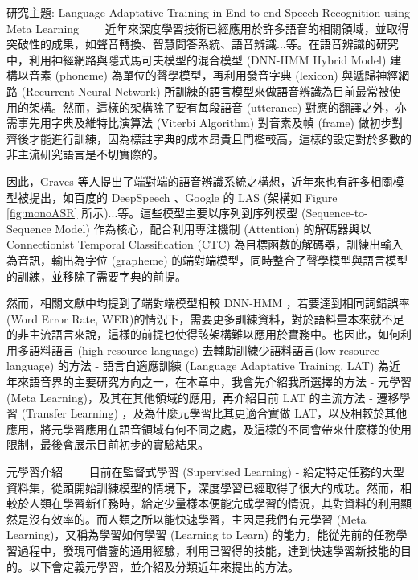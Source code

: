 \documentclass[12pt,UTF8,fntef]{article}
\begin{document}
\begin{section}{研究主題: Language Adaptative Training in End-to-end Speech Recognition using Meta Learning}
~~~~近年來深度學習技術已經應用於許多語音的相關領域，並取得突破性的成果，如聲音轉換、智慧問答系統、語音辨識...等。在語音辨識的研究中，利用神經網路與隱式馬可夫模型的混合模型 (DNN-HMM Hybrid Model) 建構以音素 (phoneme) 為單位的聲學模型，再利用發音字典 (lexicon) 與遞歸神經網路 (Recurrent Neural Network) 所訓練的語言模型來做語音辨識為目前最常被使用的架構。然而，這樣的架構除了要有每段語音 (utterance) 對應的翻譯之外，亦需事先用字典及維特比演算法 (Viterbi Algorithm) 對音素及幀 (frame) 做初步對齊後才能進行訓練，因為標註字典的成本昂貴且門檻較高，這樣的設定對於多數的非主流研究語言是不切實際的。

因此，Graves 等人提出了端對端的語音辨識系統之構想\cite{graves2014towards}，近年來也有許多相關模型被提出，如百度的 DeepSpeech \cite{hannun2014deep}、Google 的 LAS \cite{chan2016listen} (架構如 Figure \ref{fig:monoASR} 所示)...等。這些模型主要以序列到序列模型 (Sequence-to-Sequence Model) 作為核心，配合利用專注機制 (Attention) 的解碼器與以 Connectionist Temporal Classification (CTC) 為目標函數的解碼器，訓練出輸入為音訊，輸出為字位 (grapheme) 的端對端模型，同時整合了聲學模型與語言模型的訓練，並移除了需要字典的前提。

  然而，相關文獻中均提到了端對端模型相較 DNN-HMM ，若要達到相同詞錯誤率 (Word Error Rate, WER)的情況下，需要更多訓練資料，對於語料量本來就不足的非主流語言來說，這樣的前提也使得該架構難以應用於實務中。也因此，如何利用多語料語言 (high-resource language) 去輔助訓練少語料語言(low-resource language) 的方法 - 語言自適應訓練 (Language Adaptative Training, LAT) 為近年來語音界的主要研究方向之一，在本章中，我會先介紹我所選擇的方法 - 元學習 (Meta Learning)，及其在其他領域的應用，再介紹目前 LAT 的主流方法 - 遷移學習 (Transfer Learning) ，及為什麼元學習比其更適合實做 LAT，以及相較於其他應用，將元學習應用在語音領域有何不同之處，及這樣的不同會帶來什麼樣的使用限制，最後會展示目前初步的實驗結果。



  \begin{subsection}{元學習介紹}
~~~~目前在監督式學習 (Supervised Learning) - 給定特定任務的大型資料集，從頭開始訓練模型的情境下，深度學習已經取得了很大的成功。然而，相較於人類在學習新任務時，給定少量樣本便能完成學習的情況，其對資料的利用顯然是沒有效率的。而人類之所以能快速學習，主因是我們有元學習 (Meta Learning)，又稱為學習如何學習 (Learning to Learn) 的能力，能從先前的任務學習過程中，發現可借鑒的通用經驗，利用已習得的技能，達到快速學習新技能的目的。以下會定義元學習，並介紹及分類近年來提出的方法。


\end{subsection}
\end{section}
\end{document}
